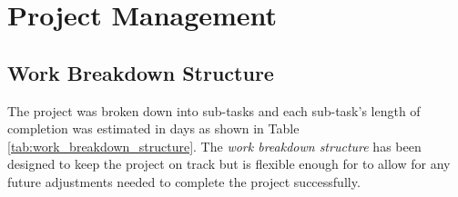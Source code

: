 \section{Project Management}
\subsection{Work Breakdown Structure}
The project was broken down into sub-tasks and each sub-task's length of completion was estimated in days as shown in Table \ref{tab:work_breakdown_structure}. The \emph{work breakdown structure} has been designed to keep the project on track but is flexible enough for to allow for any future adjustments needed to complete the project successfully.

\begin{table}[H]
    \scriptsize
    
    \renewcommand{\arraystretch}{1.125}
    
    
    \newcommand{\setCurrDate}[3]{\setdatenumber{#1}{#2}{#3}}
    
    \def\datedate{\thedatemonth/\thedateday/\thedateyear}
    
    \newcommand{\TEdate}[1]{
        \setdatebynumber{\thedatenumber}
        \multicolumn{1}{c}{#1} & 
        \datedate & 
        \addtocounter{datenumber}{#1} \setdatebynumber{\thedatenumber}
        \datedate
    }
    
    \setcounter{SubTableEntryID}{0}
    \setcounter{TableEntryID}{0}
    \newcommand\showTE{\setcounter{SubTableEntryID}{0}\stepcounter{TableEntryID}\theTableEntryID.\theSubTableEntryID \ }
    \newcommand\showSubTE{\stepcounter{SubTableEntryID}\theTableEntryID.\theSubTableEntryID \ }
    
    \newcommand{\tableEntry}[1]{\hline \multirow{2}{*}{\showTE #1}}
    \newcommand{\subTableEntry}[2]{& \showSubTE #1 & \TEdate{#2} \\ \cline{2-5}}
    \newcommand{\initialTableEntry}[2]{&0.1 #1 & \TEdate{#2} \\ \cline{2-5}}
    \newcommand{\finalTableEntry}[2]{\hline &\showTE #1 & \TEdate{#2} \\ \hline}
    

\end{table}
